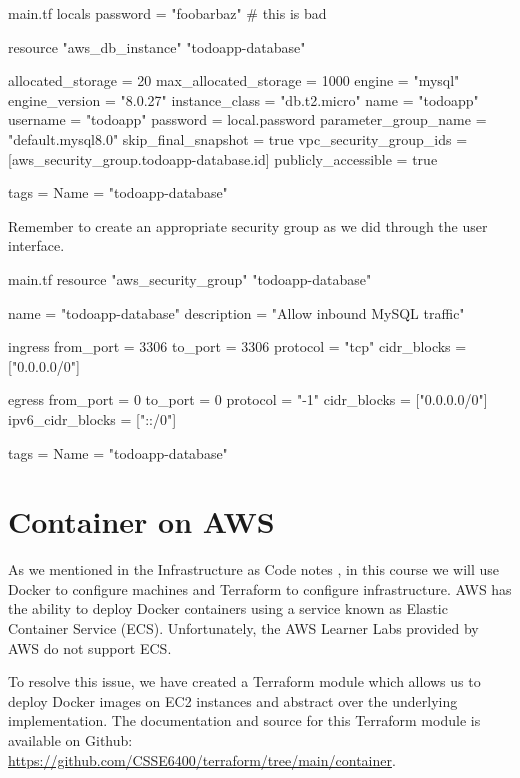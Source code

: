 \documentclass{csse4400}
\begin{document}
\begin{code}[language=terraform]{main.tf}
locals {
  password = "foobarbaz" # this is bad
}

resource "aws_db_instance" "todoapp-database" {
  allocated_storage      = 20
  max_allocated_storage  = 1000
  engine                 = "mysql"
  engine_version         = "8.0.27"
  instance_class         = "db.t2.micro"
  name                   = "todoapp"
  username               = "todoapp"
  password               = local.password
  parameter_group_name   = "default.mysql8.0"
  skip_final_snapshot    = true
  vpc_security_group_ids = [aws_security_group.todoapp-database.id]
  publicly_accessible    = true

  tags = {
    Name = "todoapp-database"
  }
}
\end{code}

\noindent Remember to create an appropriate security group as we did through the user interface.

\begin{code}[language=terraform]{main.tf}
resource "aws_security_group" "todoapp-database" {
  name        = "todoapp-database"
  description = "Allow inbound MySQL traffic"

  ingress {
    from_port        = 3306
    to_port          = 3306
    protocol         = "tcp"
    cidr_blocks      = ["0.0.0.0/0"]
  }

  egress {
    from_port        = 0
    to_port          = 0
    protocol         = "-1"
    cidr_blocks      = ["0.0.0.0/0"]
    ipv6_cidr_blocks = ["::/0"]
  }

  tags = {
    Name = "todoapp-database"
  }
}
\end{code}


\section{Container on AWS}

As we mentioned in the Infrastructure as Code notes \cite{iac-notes},
in this course we will use Docker to configure machines and Terraform to configure infrastructure.
AWS has the ability to deploy Docker containers using a service known as Elastic Container Service (ECS).
Unfortunately, the AWS Learner Labs provided by AWS do not support ECS.

To resolve this issue,
we have created a Terraform module which allows us to deploy Docker images on EC2 instances and abstract over the underlying implementation.
The documentation and source for this Terraform module is available on Github: \url{https://github.com/CSSE6400/terraform/tree/main/container}.
\end{document}
